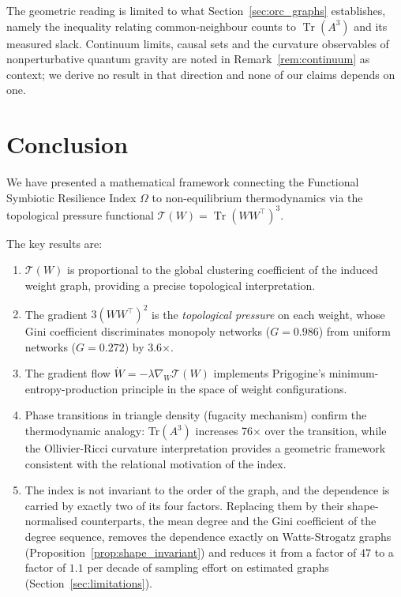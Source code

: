 \documentclass[11pt,a4paper]{article}
\begin{document}
The geometric reading is limited to what Section~\ref{sec:orc_graphs}
establishes, namely the inequality relating common-neighbour counts to
$\operatorname{Tr}(A^3)$ and its measured slack. Continuum limits, causal
sets and the curvature observables of nonperturbative quantum gravity are
noted in Remark~\ref{rem:continuum} as context; we derive no result in that
direction and none of our claims depends on one.

\section{Conclusion}

We have presented a mathematical framework connecting the Functional
Symbiotic Resilience Index $\Omega$ to non-equilibrium thermodynamics
via the topological pressure functional $\mathcal{T}(W) =
\operatorname{Tr}(WW^\top)^3$.

The key results are:
\begin{enumerate}
\item $\mathcal{T}(W)$ is proportional to the global clustering
coefficient of the induced weight graph, providing a precise
topological interpretation.
\item The gradient $3(WW^\top)^2$ is the \emph{topological pressure}
on each weight, whose Gini coefficient discriminates monopoly networks
($G = 0.986$) from uniform networks ($G = 0.272$) by 3.6×.
\item The gradient flow $\dot{W} = -\lambda \nabla_W \mathcal{T}(W)$
implements Prigogine's minimum-entropy-production principle in the
space of weight configurations.
\item Phase transitions in triangle density (fugacity mechanism)
confirm the thermodynamic analogy: Tr$(A^3)$ increases 76× over the
transition, while the Ollivier-Ricci curvature interpretation provides
a geometric framework consistent with the relational motivation of the
index.
\item The index is not invariant to the order of the graph, and the
dependence is carried by exactly two of its four factors. Replacing them
by their shape-normalised counterparts, the mean degree and the Gini
coefficient of the degree sequence, removes the dependence exactly on
Watts-Strogatz graphs (Proposition~\ref{prop:shape_invariant}) and reduces
it from a factor of $47$ to a factor of $1.1$ per decade of sampling effort
on estimated graphs (Section~\ref{sec:limitations}).
\end{enumerate}
\end{document}
